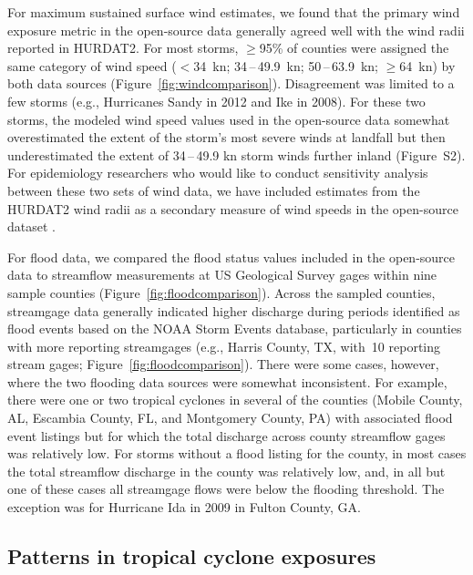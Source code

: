 For maximum sustained surface wind estimates, we found that the primary wind
exposure metric in the open-source data generally agreed well with the wind
radii reported in \ac{HURDAT2}. For most storms, $\ge$95\% of counties were
assigned the same category of wind speed ($<$34~\si{\knot};
34\,--\,49.9~\si{\knot}; 50\,--\,63.9~\si{\knot}; $\ge$64~\si{\knot}) by both
data sources (Figure~\ref{fig:windcomparison}).  Disagreement was limited to a
few storms (e.g., Hurricanes Sandy in 2012 and Ike in 2008). For these two
storms, the modeled wind speed values used in the open-source data somewhat
overestimated the extent of the storm's most severe winds at landfall but then
underestimated the extent of 34\,--\,49.9 \si{\knot} storm winds further inland
(Figure~S2). For epidemiology researchers who would like to conduct sensitivity
analysis between these two sets of wind data, we have included estimates from
the \ac{HURDAT2} wind radii as a secondary measure of wind speeds in the
open-source dataset \parencite{hurricaneexposuredata}.

For flood data, we compared the flood status values included in the open-source
data to streamflow measurements at \ac{US} Geological Survey gages within nine
sample counties (Figure~\ref{fig:floodcomparison}). Across the sampled
counties, streamgage data generally indicated higher discharge during periods
identified as flood events based on the NOAA Storm Events database,
particularly in counties with more reporting streamgages (e.g., Harris County,
TX, with~10 reporting stream gages; Figure~\ref{fig:floodcomparison}). There
were some cases, however, where the two flooding data sources were somewhat
inconsistent.  For example, there were one or two tropical cyclones in several
of the counties (Mobile County, AL, Escambia County, FL, and Montgomery County,
PA) with associated flood event listings but for which the total discharge
across county streamflow gages was relatively low. For storms without a flood
listing for the county, in most cases the total streamflow discharge in the
county was relatively low, and, in all but one of these cases all streamgage
flows were below the flooding threshold. The exception was for Hurricane Ida in
2009 in Fulton County, GA. 

\subsection*{Patterns in tropical cyclone exposures}

